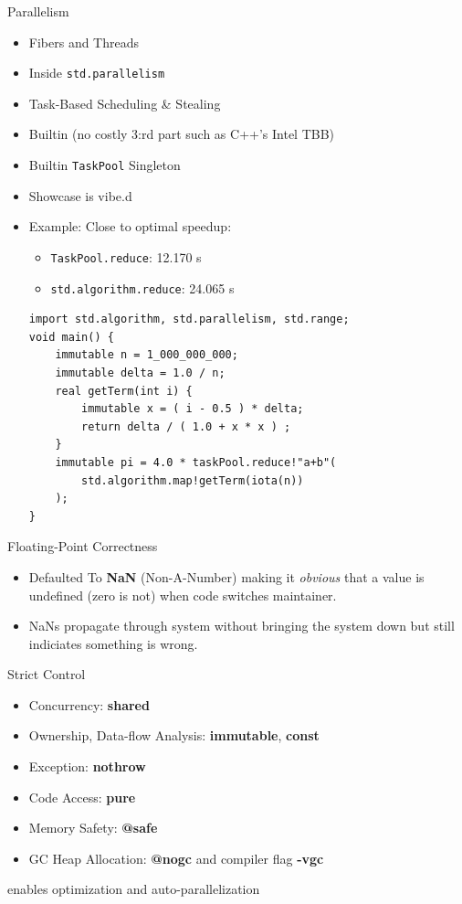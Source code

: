 \documentclass[xcolor=dvipsnames]{beamer}
\begin{document}
\begin{frame}[fragile]{Parallelism}
  \begin{itemize}[<+->]
  \item Fibers and Threads
  \item Inside \texttt{std.parallelism}
  \item Task-Based Scheduling \& Stealing
  \item Builtin (no costly 3:rd part such as C++'s Intel TBB)
  \item Builtin \texttt{TaskPool} Singleton
  \item Showcase is vibe.d
  \item Example: Close to optimal speedup:
    \begin{itemize}[<+->]
    \item \texttt{TaskPool.reduce}: 12.170 s
    \item \texttt{std.algorithm.reduce}: 24.065 s
    \end{itemize}
\begin{lstlisting}[frame=single]
import std.algorithm, std.parallelism, std.range;
void main() {
    immutable n = 1_000_000_000;
    immutable delta = 1.0 / n;
    real getTerm(int i) {
        immutable x = ( i - 0.5 ) * delta;
        return delta / ( 1.0 + x * x ) ;
    }
    immutable pi = 4.0 * taskPool.reduce!"a+b"(
        std.algorithm.map!getTerm(iota(n))
    );
}
\end{lstlisting}
  \end{itemize}
\end{frame}

\begin{frame}[fragile]{Floating-Point Correctness}
  \begin{itemize}[<+->]
  \item Defaulted To \textbf{NaN} (Non-A-Number) making it \textit{obvious} that
    a value is undefined (zero is not) when code switches maintainer.
  \item NaNs propagate through system without bringing the system down but still
    indiciates something is wrong.
  \end{itemize}
\end{frame}

\begin{frame}[fragile]{Strict Control}
  \begin{itemize}[<+->]
  \item Concurrency: \textbf{shared}
  \item Ownership, Data-flow Analysis: \textbf{immutable}, \textbf{const}
  \item Exception: \textbf{nothrow}
  \item Code Access: \textbf{pure}
  \item Memory Safety: \textbf{@safe}
  \item GC Heap Allocation: \textbf{@nogc} and compiler flag \textbf{-vgc}
  \end{itemize}
  enables optimization and auto-parallelization
\end{frame}
\end{document}
